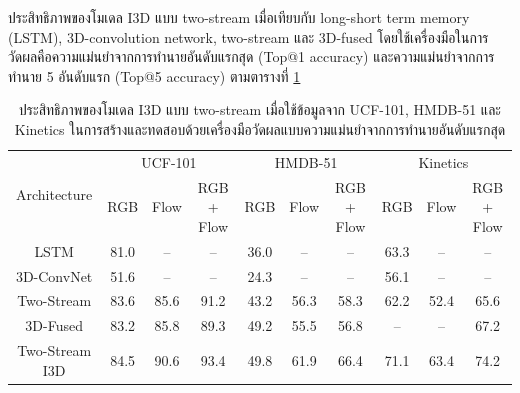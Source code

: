 \clearpage
ประสิทธิภาพของโมเดล I3D แบบ two-stream เมื่อเทียบกับ long-short term memory (LSTM),
3D-convolution network, two-stream และ 3D-fused โดยใช้เครื่องมือในการวัดผลคือความแม่นยำจากการทำนายอันดับแรกสุด (Top@1 accuracy) 
และความแม่นยำจากการทำนาย 5 อันดับแรก (Top@5 accuracy) ตามตารางที่ \ref{tab:I3DPerformance}
\begin{table}[ht]
    \begin{tabular}{|*{10}{c|}}
        \hline
        \multirow{2}{*}{Architecture} & \multicolumn{3}{c|}{UCF-101} & \multicolumn{3}{c|}{HMDB-51} & \multicolumn{3}{c|}{Kinetics}\\
        \cline{2-10}
            & RGB & Flow & RGB + Flow & RGB & Flow & RGB + Flow & RGB & Flow & RGB + Flow\\
        \hline\hline
        LSTM            & 81.0 & – & – & 36.0 & – & – & 63.3 & – & –\\
        3D-ConvNet      & 51.6 & – & – & 24.3 & – & – & 56.1 & – & –\\
        Two-Stream      & 83.6 & 85.6 & 91.2 & 43.2 & 56.3 & 58.3 & 62.2 & 52.4 & 65.6\\
        3D-Fused        & 83.2 & 85.8 & 89.3 & 49.2 & 55.5 & 56.8 & – & – & 67.2\\
        Two-Stream I3D  & 84.5 & 90.6 & 93.4 & 49.8 & 61.9 & 66.4 & 71.1 & 63.4 & 74.2\\
        \hline
    \end{tabular}
    \caption{ประสิทธิภาพของโมเดล I3D แบบ two-stream เมื่อใช้ข้อมูลจาก UCF-101, HMDB-51 และ Kinetics ในการสร้างและทดสอบด้วยเครื่องมือวัดผลแบบความแม่นยำจากการทำนายอันดับแรกสุด}
    \label{tab:I3DPerformance}
\end{table}